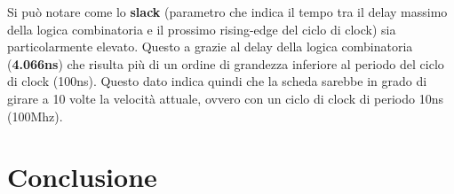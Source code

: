 \documentclass[a4paper]{report}
\begin{document}
Si può notare come lo \textbf{slack} (parametro che indica il tempo tra il delay massimo della logica combinatoria e il prossimo rising-edge del ciclo di clock) sia particolarmente elevato. Questo a grazie al delay della logica combinatoria (\textbf{4.066ns}) che risulta più di un ordine di grandezza inferiore al periodo del ciclo di clock (100ns).
Questo dato indica quindi che la scheda sarebbe in grado di girare a 10 volte la velocità attuale, ovvero con un ciclo di clock di periodo 10ns (100Mhz).


\chapter{Conclusione}
\end{document}
